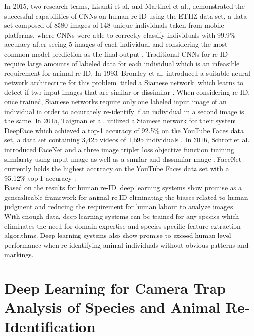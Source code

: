 \documentclass[11pt]{article}
\begin{document}
\noindent
In 2015, two research teams, Lisanti et al. and Martinel et al., demonstrated the successful capabilities of CNNs on human re-ID using the ETHZ data set, a data set composed of 8580 images of 148 unique individuals taken from mobile platforms, where CNNs were able to correctly classify individuals with 99.9\% accuracy after seeing 5 images of each individual and considering the most common model prediction as the final output \cite{lisanti2015person, martinel2015re}. Traditional CNNs for re-ID require large amounts of labeled data for each individual which is an infeasible requirement for animal re-ID. In 1993, Bromley et al. introduced a suitable neural network architecture for this problem, titled a Siamese network, which learns to detect if two input images that are similar or dissimilar \cite{bromley1994signature}. When considering re-ID, once trained, Siamese networks require only one labeled input image of an individual in order to accurately re-identify if an individual in a second image is the same. In 2015, Taigman et al. utilized a Siamese network for their system DeepFace which achieved a top-1 accuracy of 92.5\% on the YouTube Faces data set, a data set containing 3,425 videos of 1,595 individuals \cite{taigman2014deepface}. In 2016, Schroff et al. introduced FaceNet and a three image triplet loss objective function training similarity using input image as well as a similar and dissimilar image \cite{schroff2015facenet}. FaceNet currently holds the highest accuracy on the YouTube Faces data set with a 95.12\% top-1 accuracy \cite{schroff2015facenet}. 
\newline
\\
Based on the results for human re-ID, deep learning systems show promise as a generalizable framework for animal re-ID eliminating the biases related to human judgment and reducing the requirement for human labour to analyze images. With enough data, deep learning systems can be trained for any species which eliminates the need for domain expertise and species specific feature extraction algorithms. Deep learning systems also show promise to exceed human level performance when re-identifying animal individuals without obvious patterns and markings. 

\section*{Deep Learning for Camera Trap Analysis of Species and Animal Re-Identification}
\end{document}
